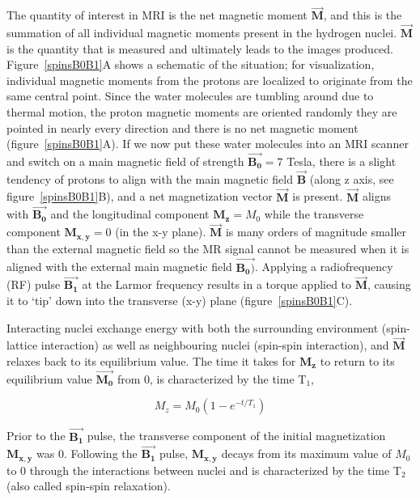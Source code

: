 The quantity of interest in MRI is the net magnetic moment  $\vec{\mathbf{M}}$, and this is the summation of all individual magnetic moments present in the hydrogen nuclei. 
$\vec{\mathbf{M}}$ is the quantity that is measured and ultimately leads to the images produced.
Figure~\ref{spinsB0B1}A shows a schematic of the situation; for visualization, individual magnetic moments from the protons are localized to originate from the same central point.
Since the water molecules are tumbling around due to thermal motion, the proton magnetic moments are oriented randomly they are pointed in nearly every direction and there is no net magnetic moment (figure~\ref{spinsB0B1}A).
If we now put these water molecules into an MRI scanner and switch on a main magnetic field of strength $\vec{\mathbf{B_0}} = 7$ Tesla, there is a slight tendency of protons to align with the main magnetic field $\vec{\mathbf{B}}$ (along z axis, see figure~\ref{spinsB0B1}B), and a net magnetization vector $\vec{\mathbf{M}}$ is present.
$\vec{\mathbf{M}}$ aligns with $\vec{\mathbf{B_0}}$ and the longitudinal component $\mathbf{M_z} = M_0$ while the transverse component $\mathbf{M_{x,y}} = 0$ (in the x-y plane).
$\vec{\mathbf{M}}$ is many orders of magnitude smaller than the external magnetic field so the MR signal cannot be measured when it is aligned with the external main magnetic field $\vec{\mathbf{B_0)}}$. 
Applying a radiofrequency (RF) pulse $\vec{\mathbf{B_1}}$ at the Larmor frequency results in a torque applied to $\vec{\mathbf{M}}$, causing it to `tip' down into the transverse (x-y) plane (figure~\ref{spinsB0B1}C).

Interacting nuclei exchange energy with both the surrounding environment (spin-lattice interaction) as well as neighbouring nuclei (spin-spin interaction), and $\vec{\mathbf{M}}$ relaxes back to its equilibrium value. 
The time it takes for $\mathbf{M_z}$ to return to its equilibrium value $\vec{\mathbf{M_0}}$ from 0, is characterized by the time T$_1$,

\begin{equation}
	M_z = M_0(1-e^{-t/T_1})
	\label{T1}
\end{equation}

Prior to the $\vec{\mathbf{B_1}}$ pulse, the transverse component of the initial magnetization $\mathbf{M_{x,y}}$ was 0.
Following the $\vec{\mathbf{B_1}}$ pulse, $\mathbf{M_{x,y}}$ decays from its maximum value of $M_0$ to 0 through the interactions between nuclei and is characterized by the time T$_2$ (also called spin-spin relaxation).
		
